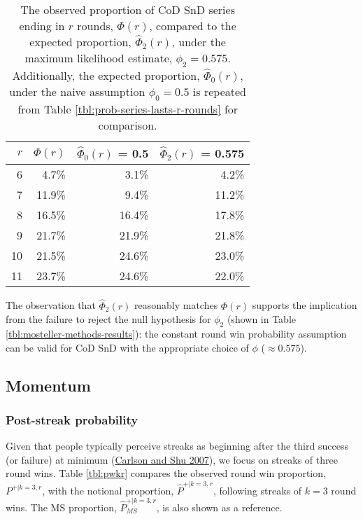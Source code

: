 \documentclass{article}
\begin{document}
\begin{table}

\caption{The observed proportion of CoD SnD series ending in $r$ rounds, $\Phi(r)$, compared to the expected proportion, $\hat{\Phi}_2(r)$, under the maximum likelihood estimate, $\phi_2 = 0.575$. Additionally, the expected proportion, $\hat{\Phi}_0(r)$, under the naive assumption $\phi_0 = 0.5$ is repeated from Table \ref{tbl:prob-series-lasts-r-rounds} for comparison.}

\centering
\begin{tabular}{rrrr}
\toprule
$r$ & $\Phi(r)$ & $\hat{\Phi}_0(r)$ = 0.5 & $\hat{\Phi}_2(r)$ = 0.575 \\
\midrule

6 & 4.7\% & 3.1\% & 4.2\% \\
7 & 11.9\% & 9.4\% & 11.2\% \\
8 & 16.5\% & 16.4\% & 17.8\% \\
9 & 21.7\% & 21.9\% & 21.8\% \\
10 & 21.5\% & 24.6\% & 23.0\% \\
11 & 23.7\% & 24.6\% & 22.0\% \\

\bottomrule
\end{tabular}

\label{tbl:alternative-constant-ps}

\end{table}

The observation that \(\hat{\Phi}_2(r)\) reasonably matches \(\Phi(r)\)
supports the implication from the failure to reject the null hypothesis
for \(\phi_2\) (shown in Table \ref{tbl:mosteller-methods-results}): the
constant round win probability assumption can be valid for CoD SnD with
the appropriate choice of \(\phi\) (\(\approx 0.575\)).

\hypertarget{momentum-1}{%
\subsection{Momentum}\label{momentum-1}}

\hypertarget{post-streak-probability}{%
\subsubsection{Post-streak probability}\label{post-streak-probability}}

Given that people typically perceive streaks as beginning after the
third success (or failure) at minimum
(\protect\hyperlink{ref-carlson2007}{Carlson and Shu 2007}), we focus on
streaks of three round wins. Table \ref{tbl:pwkr} compares the observed
round win proportion, \(P^{+|k=3,r}\), with the notional proportion,
\(\hat{P}^{+|k=3,r}\), following streaks of \(k=3\) round wins. The MS
proportion, \(\hat{P}^{+|k=3,r}_{MS}\), is also shown as a reference.
\end{document}
